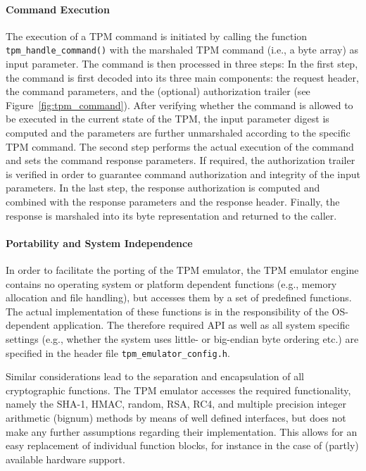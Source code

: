 \documentclass[runningheads]{llncs}
\newcommand{\file}[1]{\small\texttt{#1}\normalsize}
\newcommand{\func}[1]{\small\texttt{#1}\normalsize}
\begin{document}
\paragraph{Command Execution}
The execution of a TPM command is initiated by calling the function \func{tpm\_\-handle\_\-command()}
with the marshaled TPM command (i.e., a byte array) as input parameter. The command is then
processed in three steps: In the first step, the command
is first decoded into its three main components: the request header, the command parameters, and
the (optional) authorization trailer (see Figure~\ref{fig:tpm_command}). After verifying whether the
command is allowed to be executed in the current state of the TPM, the input parameter digest is
computed and the parameters are further unmarshaled according to the specific TPM command. The
second step performs the actual execution of the command and sets the command response parameters.
If required, the authorization trailer is verified in order to guarantee command authorization and
integrity of the input parameters. In the last step, the response authorization is computed and
combined with the response parameters and the response header. Finally, the response is
marshaled into its byte representation and returned to the caller.

\paragraph{Portability and System Independence}
In order to facilitate the porting of the TPM emulator, the TPM emulator engine contains no
operating system or platform dependent functions (e.g., memory allocation and file handling),
but accesses them by a set of predefined functions. The actual implementation of these functions
is in the responsibility of the OS-dependent application. The therefore required API as well as
all system specific settings (e.g., whether the system uses little- or big-endian byte ordering
etc.) are specified in the header file \file{tpm\_emulator\_config.h}.

Similar considerations lead to the separation and encapsulation of all cryptographic functions.
The TPM emulator accesses the required functionality, namely the SHA-1, HMAC, random, RSA, RC4,
and multiple precision integer arithmetic (bignum) methods by means of well defined interfaces,
but does not make any further assumptions regarding their implementation. This allows for an easy
replacement of individual function blocks, for instance in the case of (partly) available hardware
support.
\end{document}

